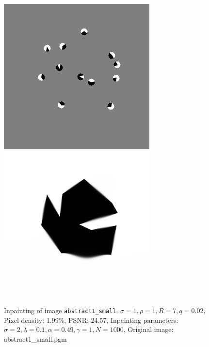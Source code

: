 \begin{figure}[ht]
    \centering
    \vspace*{0.2cm}
    \includegraphics[width=0.4\linewidth]{../Images/abstract/abstract1_small-mask_larger_radius.png}\hspace{0.2cm}
    \includegraphics[width=0.4\linewidth]{../Images/abstract/abstract1_small-inpaint_larger_radius.png}
    \caption{Inpainting of image \texttt{abstract1\_small}. $\sigma=1,\rho=1,R=7,q=0.02$, Pixel
        density: 1.99\%, PSNR\@: 24.57, Inpainting parameters:
        $\sigma=2,\lambda=0.1,\alpha=0.49,\gamma=1,N=1000$, Original image: abstract1\_small.pgm
}\label{fig:AbstractInpainting}
\end{figure}
